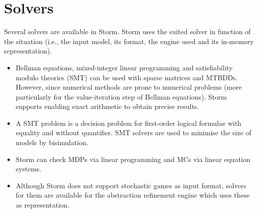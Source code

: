 \section{Solvers}
Several solvers are available in Storm.
Storm uses the suited solver in function of the situation (i.e., the input model, its format, the engine used and its in-memory representation).
\begin{itemize}
  \item Bellman equations, mixed-integer linear programming and satisfiability modulo theories (SMT) can be used with sparse matrices and MTBDDs. However,
  since numerical methods are prone to numerical problems (more particularly
  for the value-iteration step of Bellman equations), Storm supports enabling exact arithmetic to obtain precise results.
  \item A SMT problem is a decision problem for first-order logical formulae with equality and without quantifier. SMT solvers are used to minimise the size of models by bisimulation.
  \item Storm can check MDPs via linear programming and MCs via linear equation systems.
  \item Although Storm does not support stochastic games as input format,
    solvers for them are available for the abstraction refinement engine
    which uses these as representation.
\end{itemize}
